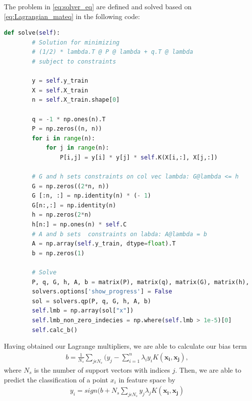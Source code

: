 The problem in \autoref{eq:solver_eq} are defined and solved based on \autoref{eq:Lagrangian_mateq}
in the following code:
\begin{lstlisting}[language=Python]
def solve(self):
        # Solution for minimizing 
        # (1/2) * lambda.T @ P @ lambda + q.T @ lambda 
        # subject to constraints

        y = self.y_train
        X = self.X_train
        n = self.X_train.shape[0]

        q = -1 * np.ones(n).T
        P = np.zeros((n, n))
        for i in range(n):
            for j in range(n):
                P[i,j] = y[i] * y[j] * self.K(X[i,:], X[j,:])
        
        # G and h sets constraints on col vec lambda: G@lambda <= h
        G = np.zeros((2*n, n))
        G [:n, :] = np.identity(n) * (- 1)
        G[n:,:] = np.identity(n)
        h = np.zeros(2*n)
        h[n:] = np.ones(n) * self.C
        # A and b sets  constraints on labda: A@lambda = b
        A = np.array(self.y_train, dtype=float).T
        b = np.zeros(1) 
    
        # Solve 
        P, q, G, h, A, b = matrix(P), matrix(q), matrix(G), matrix(h), matrix(A), matrix(b)
        solvers.options['show_progress'] = False
        sol = solvers.qp(P, q, G, h, A, b)
        self.lmb = np.array(sol["x"])
        self.lmb_non_zero_indecies = np.where(self.lmb > 1e-5)[0]
        self.calc_b()
\end{lstlisting}

Having obtained our Lagrange multipliers, we are able to calculate our bias term 
\begin{gather*}
b = \frac{1}{N_s}\sum_{j\epsilon N_s} (y_j-\sum_{i=1}^{n} \lambda _i y_i K(\boldsymbol{x_i,x_j}),
\end{gather*}
where $N_s$ is the number of support vectors with indices $j$.
Then, we are able to predict the classification of a point $x_i$ in feature space by 
\begin{gather*}
y_i = sign(b + {N_s}\sum_{j\epsilon N_s} y_j \lambda _j K(\boldsymbol{x_i,x_j})
\end{gather*}

